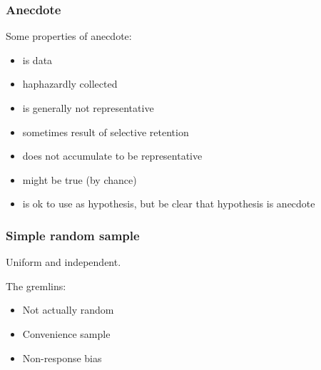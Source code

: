 \documentclass[t]{beamer}
\begin{document}
\begin{frame}
  \frametitle{Anecdote}

  Some properties of anecdote:
  
  \begin{itemize}
  \item is data
  \item haphazardly collected
  \item is generally not representative
  \item sometimes result of selective retention
  \item does not accumulate to be representative
  \item might be true (by chance)
  \item is ok to use as hypothesis, but be clear that hypothesis is anecdote
  \end{itemize}
\end{frame}

\begin{frame}
  \frametitle{Simple random sample}

  Uniform and independent.

  The gremlins:
  \begin{itemize}
  \item Not actually random
  \item Convenience sample
  \item Non-response bias
  \end{itemize}

\end{frame}

\begin{frame}
  \frametitle{}

\end{frame}

\begin{frame}
  \frametitle{}

\end{frame}

\begin{frame}
  \frametitle{}

\end{frame}

\begin{frame}
  \frametitle{}

\end{frame}

\begin{frame}
  \frametitle{}

\end{frame}
\end{document}
